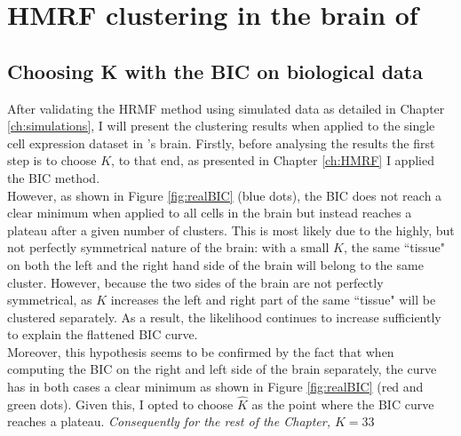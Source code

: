 \chapter{HMRF clustering in the brain of \platyfull{}}\label{ch:biology} 


	\section{Choosing K with the BIC on biological data}
	After validating the HRMF method using simulated data as detailed in Chapter \ref{ch:simulations}, I will present the clustering results when applied to the single cell expression dataset in \platy{}'s brain. Firstly, before analysing the results the first step is to choose $K$, to that end, as presented in Chapter \ref{ch:HMRF} I applied the BIC method.\\
	
	However, as shown in Figure \ref{fig:realBIC} (blue dots), the BIC does not reach a clear minimum when applied to all cells in the brain but instead reaches a plateau after a given number of clusters. This is most likely due to the highly, but not perfectly symmetrical nature of the brain: with a small $K$, the same ``tissue" on both the left and the right hand side of the brain will belong to the same cluster. However, because the two sides of the brain are not perfectly symmetrical, as $K$ increases the left and right part of the same ``tissue" will be clustered separately. As a result, the likelihood continues to increase sufficiently to explain the flattened BIC curve.\\
	
	 Moreover, this hypothesis seems to be confirmed by the fact that when computing the BIC on the right and left side of the brain separately, the curve has in both cases a clear minimum as shown in Figure \ref{fig:realBIC} (red and green dots). Given this, I opted to choose $\hat{K}$ as the point where the BIC curve reaches a plateau. \emph{Consequently for the rest of the Chapter, $K = 33$}\\
	 
	 
	
